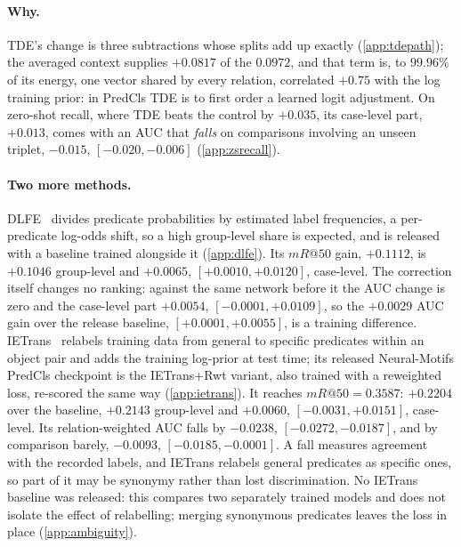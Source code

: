 \begin{table}[t]
\centering
\scriptsize
\caption{\textbf{The split under all six recall protocols}, micro-pooled mean recall with ($mR$)
and without (ng-$mR$) the graph constraint at $K=20,50,100$; case-level intervals
image-clustered.}
\label{tab:protocols}
\resizebox{\linewidth}{!}{}
\end{table}

\paragraph{Why.} TDE's change is three subtractions whose splits add up exactly
(\cref{app:tdepath}); the averaged context supplies $+0.0817$ of the $0.0972$, and that term is,
to $99.96\%$ of its energy, one vector shared by every relation, correlated $+0.75$ with the log
training prior: in PredCls TDE is to first order a learned logit adjustment. On zero-shot
recall, where TDE beats the control by $+0.035$, its case-level part, $+0.013$, comes with an AUC
that \emph{falls} on comparisons involving an unseen triplet, $-0.015$, $[-0.020,-0.006]$
(\cref{app:zsrecall}).

\paragraph{Two more methods.} DLFE~\cite{chiou2021recovering} divides predicate
probabilities by estimated label frequencies, a per-predicate log-odds shift, so a high
group-level share is expected, and is released with a baseline trained alongside it
(\cref{app:dlfe}). Its $mR@50$ gain, $+0.1112$, is $+0.1046$ group-level and $+0.0065$,
$[+0.0010,+0.0120]$, case-level. The correction itself changes no ranking: against the same
network before it the AUC change is zero and the case-level part $+0.0054$,
$[-0.0001,+0.0109]$, so the $+0.0029$ AUC gain over the release baseline, $[+0.0001,+0.0055]$,
is a training difference. IETrans~\cite{zhang2022finegrained} relabels training data from
general to specific predicates within an object pair and adds the training log-prior at test
time; its released Neural-Motifs PredCls checkpoint is the IETrans+Rwt variant, also trained
with a reweighted loss, re-scored the same way (\cref{app:ietrans}). It reaches $mR@50=0.3587$:
$+0.2204$ over the baseline, $+0.2143$ group-level and $+0.0060$, $[-0.0031,+0.0151]$,
case-level. Its relation-weighted AUC falls by $-0.0238$, $[-0.0272,-0.0187]$, and by
comparison barely, $-0.0093$, $[-0.0185,-0.0001]$. A fall measures agreement with
the recorded labels, and IETrans relabels general predicates as specific ones, so part of it
may be synonymy rather than lost discrimination. No IETrans baseline was released: this
compares two separately trained models and does not isolate the effect of relabelling; merging
synonymous predicates leaves the loss in place (\cref{app:ambiguity}).

